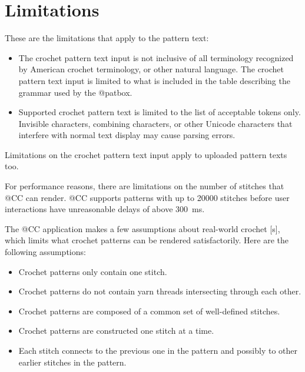 \documentclass[main.tex]{subfiles}
\begin{document}
\chapter{Limitations}\label{chp:limitations}

These are the limitations that apply to the pattern text:
\begin{itemize}
\item The crochet pattern text input is not inclusive of all terminology recognized by American crochet terminology, or other natural language. The crochet pattern text input is limited to what is included in the table describing the grammar used by the @patbox.
\item Supported crochet pattern text is limited to the list of acceptable tokens only. Invisible characters, combining characters, or other Unicode characters that interfere with normal text display may cause parsing errors.
\end{itemize}

Limitations on the crochet pattern text input apply to uploaded pattern texts too.

For performance reasons, there are limitations on the number of stitches that @CC can render.
@CC supports patterns with up to \num{20000} stitches before user interactions have unreasonable delays of above \qty{300}{ms}. 

The @CC application makes a few assumptions about real-world crochet [s], which limits what crochet patterns can be rendered satisfactorily. Here are the following assumptions:

\begin{itemize}
\item Crochet patterns only contain one  stitch.
\item Crochet patterns do not contain yarn threads intersecting through each other.
\item Crochet patterns are composed of a common set of well-defined stitches.
\item Crochet patterns are constructed one stitch at a time.
\item Each stitch connects to the previous one in the pattern and possibly to other earlier stitches in the pattern.
\end{itemize}
\end{document}
